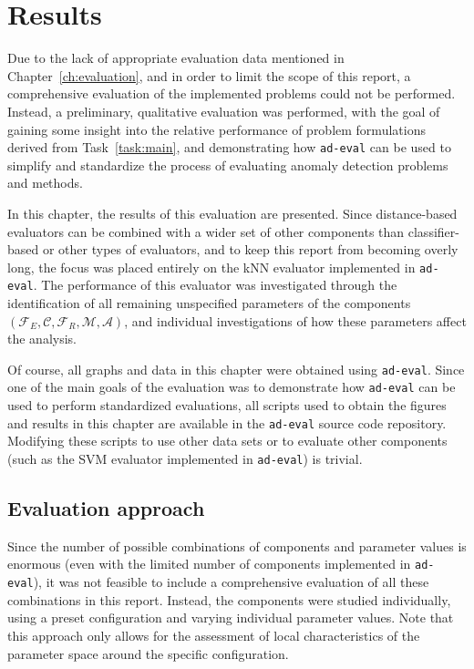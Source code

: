 \chapter{Results}
\label{ch:results}

Due to the lack of appropriate evaluation data mentioned in Chapter~\ref{ch:evaluation}, and in order to limit the scope of this report, a comprehensive evaluation of the implemented problems could not be performed. Instead, a preliminary, qualitative evaluation was performed, with the goal of gaining some insight into the relative performance of problem formulations derived from Task~\ref{task:main}, and demonstrating how \texttt{ad-eval} can be used to simplify and standardize the process of evaluating anomaly detection problems and methods. 

In this chapter, the results of this evaluation are presented. Since distance-based evaluators can be combined with a wider set of other components than classifier-based or other types of evaluators, and to keep this report from becoming overly long, the focus was placed entirely on the kNN evaluator implemented in \texttt{ad-eval}. The performance of this evaluator was investigated through the identification of all remaining unspecified parameters of the components $(\mathcal{F}_E, \mathcal{C}, \mathcal{F}_R, \mathcal{M},\mathcal{A})$, and individual investigations of how these parameters affect the analysis.

Of course, all graphs and data in this chapter were obtained using \texttt{ad-eval}. Since one of the main goals of the evaluation was to demonstrate how \texttt{ad-eval} can be used to perform standardized evaluations, all scripts used to obtain the figures and results in this chapter are available in the \texttt{ad-eval} source code repository. Modifying these scripts to use other data sets or to evaluate other components (such as the SVM evaluator implemented in \texttt{ad-eval}) is trivial.

\section{Evaluation approach}

Since the number of possible combinations of components and parameter values is enormous (even with the limited number of components implemented in \texttt{ad-eval}), it was not feasible to include a comprehensive evaluation of all these combinations in this report. Instead, the components were studied individually, using a preset configuration and varying individual parameter values. Note that this approach only allows for the assessment of local characteristics of the parameter space around the specific configuration.


